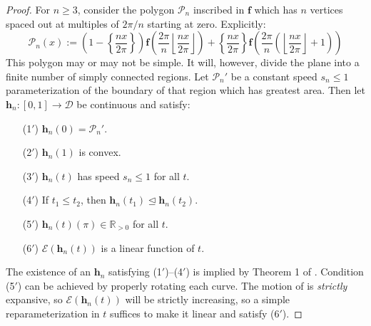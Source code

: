 \documentclass{amsart}
\newcommand{\R}			{\mathbb R}
\newcommand{\f}			{\mathbf f}
\newcommand{\h}			{\mathbf h}
\newcommand{\map}		{\longrightarrow}
\numberwithin{equation}{section}
\begin{document}
\begin{proof}
For $n\geq 3$, consider the polygon $\mathcal P_n$ 
inscribed in $\f$ which has $n$ vertices spaced 
out at multiples of $2\pi/n$ starting at zero.  
Explicitly:
\begin{equation}
\mathcal P_n(x):=\left(1-\left\{\frac{nx}{2\pi}\right\}\right)
\f\left(\frac{2\pi}n\left\lfloor\frac{nx}{2\pi}\right\rfloor\right)
+\left\{\frac{nx}{2\pi}\right\}
\f\left(\frac{2\pi}n\left(\left\lfloor\frac{nx}{2\pi}\right\rfloor+1\right)\right)
\end{equation}
This polygon may or may not be simple.  It will, 
however, divide the plane into a finite number of 
simply connected regions.  Let $\mathcal P_n'$ be a constant 
speed $s_n\leq 1$ parameterization of the boundary 
of that region which has greatest area.  Then let 
$\h_n:[0,1]\map\mathcal D$ be continuous and satisfy:
\begin{itemize}
\item[(1$'$)] $\h_n(0)=\mathcal P_n'$.
\item[(2$'$)] $\h_n(1)$ is convex.
\item[(3$'$)] $\h_n(t)$ has speed $s_n\leq 1$ for all $t$.
\item[(4$'$)] If $t_1\leq t_2$, then $\h_n(t_1)\trianglelefteq\h_n(t_2)$.
\item[(5$'$)] $\h_n(t)(\pi)\in\R_{>0}$ for all $t$.
\item[(6$'$)] $\mathcal E(\h_n(t))$ is a linear function of $t$.
\end{itemize}
The existence of an $\h_n$ satisfying (1$'$)--(4$'$) is 
implied by Theorem 1 of \cite[p. 207]{cdr}.  
Condition (5$'$) can be achieved by properly rotating 
each curve.  The motion of \cite{cdr} is {\it strictly} 
expansive, so $\mathcal E(\h_n(t))$ will be strictly 
increasing, so a simple reparameterization in $t$ 
suffices to make it linear and satisfy (6$'$).


\end{proof}
\end{document}
